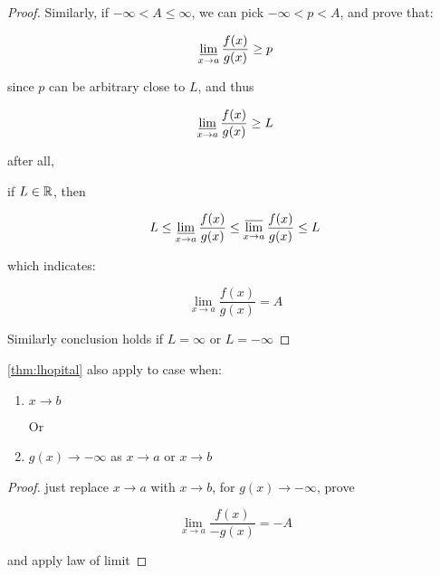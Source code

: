 \begin{proof}
    Similarly, if $-\infty < A \le \infty$, we can pick $-\infty < p < A$, and prove that:

    \[
        \varliminf_{x \to a} \frac{f(x)}{g(x)} \ge  p
    \]

    since $p$ can be arbitrary close to $L$, and thus


    \[
        \varliminf_{x \to a} \frac{f(x)}{g(x)} \ge L
    \]

    after all,
    
    if $L \in \mathbb{R}$, then

    \[
        L \le \varliminf_{x \to a}\frac{f(x)}{g(x)} \le \varlimsup_{x \to a}\frac{f(x)}{g(x)} \le L
    \]


    which indicates:

    \[
        \lim_{x \to a}\frac{f(x)}{g(x)} = A
    \]


    Similarly conclusion holds if $L = \infty$ or $L = -\infty$
\end{proof}

\begin{corollary}
   \autoref{thm:lhopital} also apply to case when:
   
   \begin{enumerate}
    \item $x \to b$

    Or

    \item $g(x) \to -\infty$ as $x \to a$ or $x \to b$
   \end{enumerate}
\end{corollary}

\begin{proof}
    just replace $x \to a$ with $x \to b$, for $g(x) \to -\infty$, prove

    \[
        \lim_{x \to a}\frac{f(x)}{-g(x)} = -A
    \]

    and apply law of limit
\end{proof}